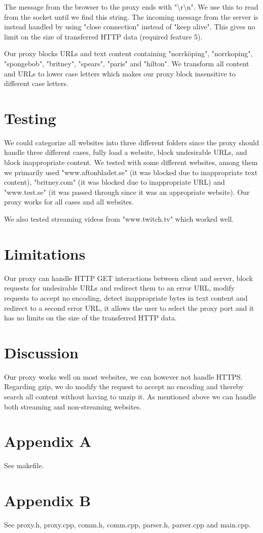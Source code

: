 \documentclass[10pt]{article}
\begin{document}
The message from the browser to the proxy ends with
"\textbackslash r\textbackslash n". We use this to read from the socket until
we find this string. The incoming message from the server is instead handled by
using "close connection" instead of "keep alive". This gives no limit on the
size of transferred HTTP data (required feature 5).

Our proxy blocks URLs and text content containing "norrk\"oping", "norrkoping",
"spongebob", "britney", "spears", "paris" and "hilton". We transform all content and
URLs to lower case letters which makes our proxy block insensitive to different
case letters.

\section{Testing}
We could categorize all websites into three different folders since the
proxy should handle three different cases, fully load a website,
block undesirable URLs, and block inappropriate content. We tested with some
different websites, among them we primarily used "www.aftonbladet.se"
(it was blocked due to inappropriate text content),
"britney.com" (it was blocked due to inappropriate URL) and "www.test.se" (it was passed through since
it was an appropriate website). Our proxy works for all cases and all websites.

We also tested streaming videos from "www.twitch.tv" which worked well.

\section{Limitations}
Our proxy can handle HTTP GET interactions between client and server,
block requests for undesirable URLs and redirect them to an error URL,
modify requests to accept no encoding, detect inappropriate bytes in text
content and redirect to a second error URL, it allows the user to select the
proxy port and it has no limits on the size of the transferred HTTP data.

\section{Discussion}
Our proxy works well on most websites, we can however not handle HTTPS.
Regarding gzip, we do modify the request to accept no encoding and thereby
search all content without having to unzip it. As mentioned above we can
handle both streaming and non-streaming websites.

\section*{Appendix A}
See makefile.

\section*{Appendix B}
See proxy.h, proxy.cpp, comm.h, comm.cpp, parser.h, parser.cpp and main.cpp.
\end{document}
